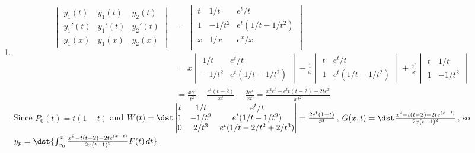 \documentclass[openany]{book}
\newenvironment{sectionSolutions}{
 \begin{enumerate}[item-label={\thesection.\arabic{enumi}.}]
}{
 \end{enumerate}
}
\begin{document}
\begin{sectionSolutions}
\item
\begin{align*}
\begin{vmatrix}
y_1(t)&y_1(t)&y_2(t)\\
y_1'(t)&y_1'(t)&y_2'(t)\\
y_1(x)&y_1(x)&y_2(x)
\end{vmatrix}&=
\begin{vmatrix}
t&1/t&e^t/t\\
1&-1/t^2&e^t(1/t-1/t^2)\\
x&1/x&e^x/x\\
\end{vmatrix}\\
&=x\begin{vmatrix}1/t&e^t/t\\-1/t^2&e^t(1/t-1/t^2)\end{vmatrix}
-\frac{1}{ x}\begin{vmatrix}t&e^t/t\\1&e^t(1/t-1/t^2)\end{vmatrix}
+\frac{e^x}{ x}\begin{vmatrix}t&1/t\\1&-1/t^2\end{vmatrix}\\
&=\frac{xe^t}{ t^2}-\frac{e^t(t-2)}{ xt}-\frac{2e^x}{ xt}
=\frac{x^2e^t-e^tt(t-2)-2te^x}{ xt^2}
\end{align*}
Since $P_0(t)=t(1-t)$ and
$W(t)=\dst\begin{vmatrix}
t&1/t&e^t/t\\
1&-1/t^2&e^t(1/t-1/t^2)\\
0&2/t^3&e^t(1/t-2/t^2+2/t^3)
\end{vmatrix}=\frac{2e^t(1-t)}{ t^3}$,
$G(x,t)=\dst\frac{x^2-t(t-2)-2te^{(x-t)}}{ 2x(t-1)^2}$, so
$y_p=\dst{\int_{x_0}^x \frac{x^2-t(t-2)-2te^{(x-t)}}{ 2x(t-1)^2}
F(t)\,dt}$.



\end{sectionSolutions}
\end{document}
